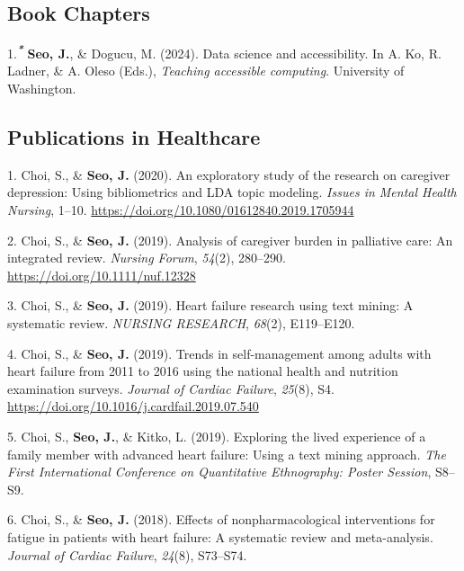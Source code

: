 \documentclass[11pt,a4paper,]{awesome-cv}
\newlength{\cslhangindent}
\newenvironment{CSLReferences}[2] %
 {\begin{list}{}{%
  \setlength{\itemindent}{0pt}
  \setlength{\leftmargin}{0pt}
  \setlength{\parsep}{0pt}
  \ifodd #1
   \setlength{\leftmargin}{\cslhangindent}
   \setlength{\itemindent}{-1\cslhangindent}
  \fi
  \setlength{\itemsep}{#2\baselineskip}}}
 {\end{list}}
\begin{document}
\subsection{Book Chapters}\label{book-chapters}

\label{refs-06a43cf8d0163263410720e1e6ecf8e3}
\begin{CSLReferences}{1}{0}
1.\textsuperscript{\textbf{\emph{*}}} \textbf{Seo, J.}, \& Dogucu, M.
(2024). Data science and accessibility. In A. Ko, R. Ladner, \& A. Oleso
(Eds.), \emph{Teaching accessible computing}. University of Washington.

\end{CSLReferences}

\subsection{Publications in
Healthcare}\label{publications-in-healthcare}

\label{refs-d735fc8e424a60effc95b6b86f680502}
\begin{CSLReferences}{1}{0}
1. Choi, S., \& \textbf{Seo, J.} (2020). An exploratory study of the
research on caregiver depression: Using bibliometrics and LDA topic
modeling. \emph{Issues in Mental Health Nursing}, 1--10.
\url{https://doi.org/10.1080/01612840.2019.1705944}

2. Choi, S., \& \textbf{Seo, J.} (2019). Analysis of caregiver burden in
palliative care: An integrated review. \emph{Nursing Forum},
\emph{54}(2), 280--290. \url{https://doi.org/10.1111/nuf.12328}

3. Choi, S., \& \textbf{Seo, J.} (2019). Heart failure research using
text mining: A systematic review. \emph{NURSING RESEARCH}, \emph{68}(2),
E119--E120.

4. Choi, S., \& \textbf{Seo, J.} (2019). Trends in self-management among
adults with heart failure from 2011 to 2016 using the national health
and nutrition examination surveys. \emph{Journal of Cardiac Failure},
\emph{25}(8), S4. \url{https://doi.org/10.1016/j.cardfail.2019.07.540}

5. Choi, S., \textbf{Seo, J.}, \& Kitko, L. (2019). Exploring the lived
experience of a family member with advanced heart failure: Using a text
mining approach. \emph{The First International Conference on
Quantitative Ethnography: Poster Session}, S8--S9.

6. Choi, S., \& \textbf{Seo, J.} (2018). Effects of nonpharmacological
interventions for fatigue in patients with heart failure: A systematic
review and meta-analysis. \emph{Journal of Cardiac Failure},
\emph{24}(8), S73--S74.

\end{CSLReferences}
\end{document}
